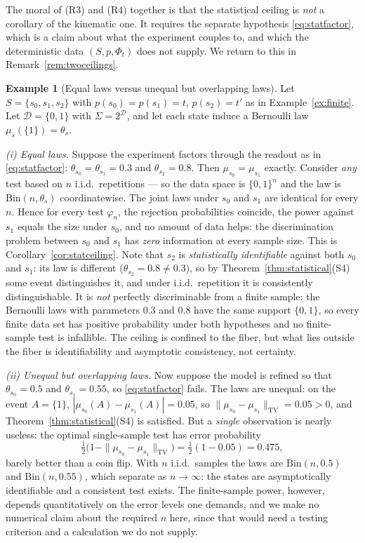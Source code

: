 \documentclass[11pt,reqno]{amsart}
\theoremstyle{plain}
\theoremstyle{definition}
\newtheorem{example}[theorem]{Example}
\theoremstyle{remark}
\newcommand{\TV}{\mathrm{TV}}
\begin{document}
The moral of (R3) and (R4) together is that the statistical ceiling is \emph{not} a corollary of the kinematic one. It requires the separate hypothesis \eqref{eq:statfactor}, which is a claim about what the experiment couples to, and which the deterministic data $(S,p,\Phi_t)$ does not supply. We return to this in Remark~\ref{rem:twoceilings}.

\begin{example}[Equal laws versus unequal but overlapping laws]\label{ex:statistical}
Let $S=\{s_0,s_1,s_2\}$ with $p(s_0)=p(s_1)=t$, $p(s_2)=t'$ as in Example~\ref{ex:finite}. Let $\mathcal D=\{0,1\}$ with $\Sigma=2^{\mathcal D}$, and let each state induce a Bernoulli law $\mu_s(\{1\})=\theta_s$.

\emph{(i) Equal laws.} Suppose the experiment factors through the readout as in \eqref{eq:statfactor}: $\theta_{s_0}=\theta_{s_1}=0.3$ and $\theta_{s_2}=0.8$. Then $\mu_{s_0}=\mu_{s_1}$ exactly. Consider \emph{any} test based on $n$ i.i.d.\ repetitions --- so the data space is $\{0,1\}^n$ and the law is $\mathrm{Bin}(n,\theta_s)$ coordinatewise. The joint laws under $s_0$ and $s_1$ are identical for every $n$. Hence for every test $\varphi_n$, the rejection probabilities coincide, the power against $s_1$ equals the size under $s_0$, and no amount of data helps: the discrimination problem between $s_0$ and $s_1$ has \emph{zero} information at every sample size. This is Corollary~\ref{cor:statceiling}. Note that $s_2$ is \emph{statistically identifiable} against both $s_0$ and $s_1$: its law is different ($\theta_{s_2}=0.8\neq0.3$), so by Theorem~\ref{thm:statistical}(S4) some event distinguishes it, and under i.i.d.\ repetition it is consistently distinguishable. It is \emph{not} perfectly discriminable from a finite sample: the Bernoulli laws with parameters $0.3$ and $0.8$ have the same support $\{0,1\}$, so every finite data set has positive probability under both hypotheses and no finite-sample test is infallible. The ceiling is confined to the fiber, but what lies outside the fiber is identifiability and asymptotic consistency, not certainty.

\emph{(ii) Unequal but overlapping laws.} Now suppose the model is refined so that $\theta_{s_0}=0.5$ and $\theta_{s_1}=0.55$, so \eqref{eq:statfactor} fails. The laws are unequal: on the event $A=\{1\}$, $|\mu_{s_0}(A)-\mu_{s_1}(A)|=0.05$, so $\|\mu_{s_0}-\mu_{s_1}\|_{\TV}=0.05>0$, and Theorem~\ref{thm:statistical}(S4) is satisfied. But a \emph{single} observation is nearly useless: the optimal single-sample test has error probability
\[
\tfrac12\bigl(1-\|\mu_{s_0}-\mu_{s_1}\|_{\TV}\bigr)=\tfrac12(1-0.05)=0.475 ,
\]
barely better than a coin flip. With $n$ i.i.d.\ samples the laws are $\mathrm{Bin}(n,0.5)$ and $\mathrm{Bin}(n,0.55)$, which separate as $n\to\infty$: the states are asymptotically identifiable and a consistent test exists. The finite-sample power, however, depends quantitatively on the error levels one demands, and we make no numerical claim about the required $n$ here, since that would need a testing criterion and a calculation we do not supply.


\end{example}
\end{document}
